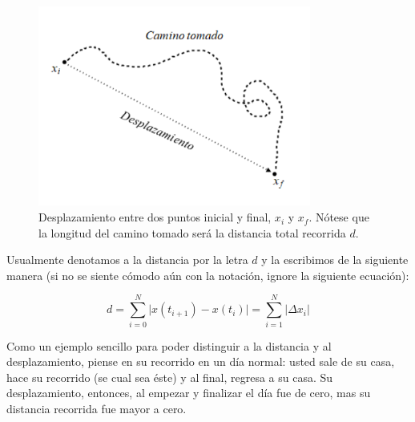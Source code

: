 \begin{figure}[ht]
\centering
  \includegraphics[width=0.8\textwidth]{lecture2/desplazamiento.PNG}
\caption{Desplazamiento entre dos puntos inicial y final, $x_{i}$ y $x_{f}$. N\'otese que la longitud del camino tomado ser\'a la distancia total recorrida $d$.}
\label{fig:despl2}
\end{figure}

Usualmente denotamos a la distancia por la letra $d$ y la escribimos de la siguiente manera (si no se siente c\'omodo a\'un con la notaci\'on, ignore la siguiente ecuaci\'on):

\begin{equation}\label{eq:distancia}
    d = \sum_{i=0}^{N}\lvert x(t_{i+1}) - x(t_{i}) \rvert = \sum_{i=1}^{N}\lvert \Delta x_{i} \rvert 
\end{equation}

Como un ejemplo sencillo para poder distinguir a la distancia y al desplazamiento, piense en su recorrido en un d\'ia normal: usted sale de su casa, hace su recorrido (se cual sea \'este) y al final, regresa a su casa. Su desplazamiento, entonces, al empezar y finalizar el d\'ia fue de cero, mas su distancia recorrida fue mayor a cero. 

